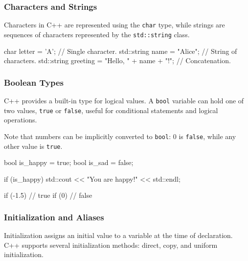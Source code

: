 \subsubsection{Characters and Strings}

Characters in C++ are represented using the \texttt{char} type, while strings are sequences of characters represented by the \texttt{std::string} class.

\begin{exampleblock}
    \begin{codeblock}[language=C++]
char letter = 'A'; // Single character.
std::string name = "Alice"; // String of characters.
std::string greeting = "Hello, " + name + "!"; // Concatenation.
    \end{codeblock}
\end{exampleblock}

\subsubsection{Boolean Types}

C++ provides a built-in  type for logical values. A \texttt{bool} variable can hold one of two values, \texttt{true} or \texttt{false}, useful for conditional statements and logical operations.

Note that numbers can be implicitly converted to \texttt{bool}: 0 is \texttt{false}, while any other value is \texttt{true}.

\begin{exampleblock}[Boolean]
    \begin{codeblock}[language=C++]
bool is_happy = true;
bool is_sad = false;

if (is_happy) {
    std::cout << "You are happy!" << std::endl;
}
    \end{codeblock}
    \begin{codeblock}[language=C++]
if (-1.5) // true
if (0)    // false
    \end{codeblock}
\end{exampleblock}

\subsubsection{Initialization and Aliases}

Initialization assigns an initial value to a variable at the time of declaration. C++ supports several initialization methods: direct, copy, and uniform initialization.

